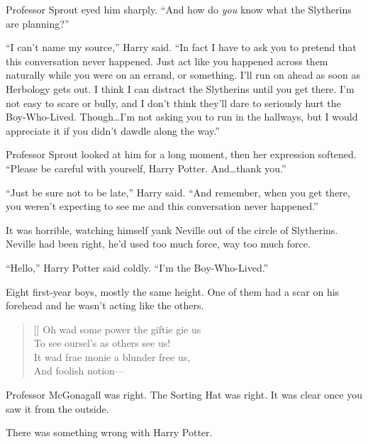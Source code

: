 \later

Professor Sprout eyed him sharply. “And how do \emph{you} know what the Slytherins are planning?”

“I can’t name my source,” Harry said. “In fact I have to ask you to pretend that this conversation never happened. Just act like you happened across them naturally while you were on an errand, or something. I’ll run on ahead as soon as Herbology gets out. I think I can distract the Slytherins until you get there. I’m not easy to scare or bully, and I don’t think they’ll dare to seriously hurt the Boy-Who-Lived. Though…I’m not asking you to run in the hallways, but I would appreciate it if you didn’t dawdle along the way.”

Professor Sprout looked at him for a long moment, then her expression softened. “Please be careful with yourself, Harry Potter. And…thank you.”

“Just be sure not to be late,” Harry said. “And remember, when you get there, you weren’t expecting to see me and this conversation never happened.”

\later

It was horrible, watching himself yank Neville out of the circle of Slytherins. Neville had been right, he’d used too much force, way too much force.

“Hello,” Harry Potter said coldly. “I’m the Boy-Who-Lived.”

Eight first-year boys, mostly the same height. One of them had a scar on his forehead and he wasn’t acting like the others.

\baselineskip\settowidth{\versewidth}{It wad frae monie a blunder free us,} \begin{verse}[\versewidth] Oh wad some power the giftie gie us\\ To see oursel’s as others see us!\\ It wad frae monie a blunder free us,\\ And foolish notion— \end{verse}

Professor McGonagall was right. The Sorting Hat was right. It was clear once you saw it from the outside.

There was something wrong with Harry Potter.

